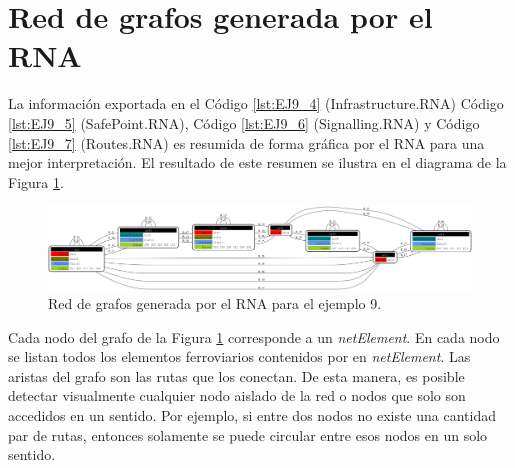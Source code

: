 \section{Red de grafos generada por el RNA}
	
	La información exportada en el Código \ref{lst:EJ9_4} (Infrastructure.RNA) Código \ref{lst:EJ9_5} (SafePoint.RNA), Código \ref{lst:EJ9_6} (Signalling.RNA) y Código \ref{lst:EJ9_7} (Routes.RNA) es resumida de forma gráfica por el RNA para una mejor interpretación. El resultado de este resumen se ilustra en el diagrama de la Figura \ref{fig:EJ9_8}.
	
	\begin{figure}[H]
		\centering
		\includegraphics[width=1\textwidth]{Figuras/Graph_9}
		\centering\caption{Red de grafos generada por el RNA para el ejemplo 9.}
		\label{fig:EJ9_8}
	\end{figure}
	
	Cada nodo del grafo de la Figura \ref{fig:EJ9_8} corresponde a un \textit{netElement}. En cada nodo se listan todos los elementos ferroviarios contenidos por en \textit{netElement}. Las aristas del grafo son las rutas que los conectan. De esta manera, es posible detectar visualmente cualquier nodo aislado de la red o nodos que solo son accedidos en un sentido. Por ejemplo, si entre dos nodos no existe una cantidad par de rutas, entonces solamente se puede circular entre esos nodos en un solo sentido.